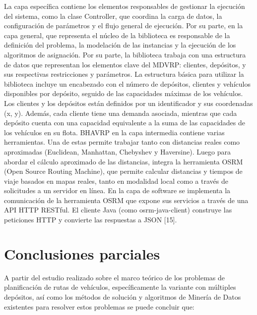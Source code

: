 La capa espec\'ifica contiene los elementos responsables de gestionar la ejecuci\'on del sistema, como la clase Controller, que coordina la carga de datos, la configuraci\'on de par\'ametros y el flujo general de ejecuci\'on. Por su parte, en la capa general, que representa el n\'ucleo de la biblioteca es responsable de la definici\'on del problema, la modelaci\'on de las instancias y la ejecuci\'on de los algoritmos de asignaci\'on. Por su parte, la biblioteca trabaja con una estructura de datos que representan los elementos clave del MDVRP: clientes, dep\'ositos, y sus respectivas restricciones y par\'ametros. La estructura b\'asica para utilizar la biblioteca incluye un encabezado con el n\'umero de dep\'ositos, clientes y veh\'iculos disponibles por dep\'osito, seguido de las capacidades m\'aximas de los veh\'iculos. Los clientes y los dep\'ositos est\'an definidos por un identificador y sus coordenadas (x, y). Adem\'as, cada cliente tiene una demanda asociada, mientras que cada dep\'osito cuenta con una capacidad equivalente a la suma de las capacidades de los veh\'iculos en su flota. BHAVRP en la capa intermedia contiene varias herramientas. Una de estas permite trabajar tanto con distancias reales como aproximadas (Euclidean, Manhattan, Chebyshev y Haversine). Luego para abordar el c\'alculo aproximado de las distancias, integra la herramienta OSRM (Open Source Routing Machine), que permite calcular distancias y tiempos de viaje basados en mapas reales, tanto en modalidad local como a trav\'es de solicitudes a un servidor en l\'inea. En la capa de software se implementa la comunicaci\'on de la herramienta OSRM que expone sus servicios a trav\'es de una API HTTP RESTful. El cliente Java (como osrm-java-client) construye las peticiones HTTP y convierte las respuestas a JSON [15].

\section{Conclusiones parciales}

A partir del estudio realizado sobre el marco te\'orico de los problemas de planificaci\'on de rutas de veh\'iculos, espec\'ificamente la variante con m\'ultiples dep\'ositos, as\'i como los m\'etodos de soluci\'on y algoritmos de Miner\'ia de Datos existentes para resolver estos problemas se puede concluir que:

